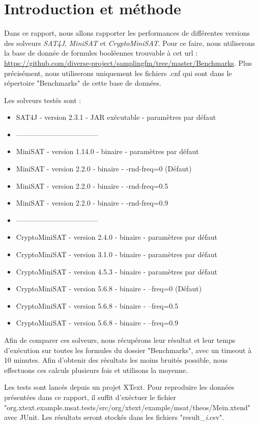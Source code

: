 \documentclass[11pt,a4paper]{article}
\author{Théo Gouzien - Théo Losekoot}
\begin{document}
\section{Introduction et méthode}

Dans ce rapport, nous allons rapporter les performances de différentes versions des solveurs \textit{SAT4J}, \textit{MiniSAT} et \textit{CryptoMiniSAT}.
Pour ce faire, nous utiliserons la base de donnée de formules booléennes trouvable à cet url : \url{https://github.com/diverse-project/samplingfm/tree/master/Benchmarks}.
Plus précisément, nous utiliserons uniquement les fichiers .cnf qui sont dans le répertoire "Benchmarks" de cette base de données.

Les solveurs testés sont : 
\begin{itemize}
\item SAT4J - version 2.3.1 - JAR exécutable - paramètres par défaut 
\item -----------------------------------
\item MiniSAT - version 1.14.0 - binaire - paramètres par défaut
\item MiniSAT - version 2.2.0  - binaire - -rnd-freq=0 (Défaut)
\item MiniSAT - version 2.2.0  - binaire - -rnd-freq=0.5
\item MiniSAT - version 2.2.0  - binaire - -rnd-freq=0.9
\item -----------------------------------
\item CryptoMiniSAT - version 2.4.0 - binaire - paramètres par défaut
\item CryptoMiniSAT - version 3.1.0 - binaire - paramètres par défaut
\item CryptoMiniSAT - version 4.5.3 - binaire - paramètres par défaut
\item CryptoMiniSAT - version 5.6.8 - binaire - --freq=0 (Défaut)
\item CryptoMiniSAT - version 5.6.8 - binaire - --freq=0.5
\item CryptoMiniSAT - version 5.6.8 - binaire - --freq=0.9
\end{itemize}

Afin de comparer ces solveurs, nous récupérons leur résultat et leur temps d'exécution sur toutes les formules du dossier "Benchmarks", avec un timeout à 10 minutes. 
Afin d'obtenir des résultats les moins bruités possible, nous effectuons ces calculs plusieurs fois et utilisons la moyenne.

Les tests sont lancés depuis un projet XText. Pour reproduire les données présentées dans ce rapport, il suffit d'exéctuer le fichier "org.xtext.example.msat.tests/src/org/xtext/example/msat/theos/Mein.xtend" avec JUnit. Les résultats seront stockés dans les fichiers "result\_\textit{i}.csv".
\end{document}
